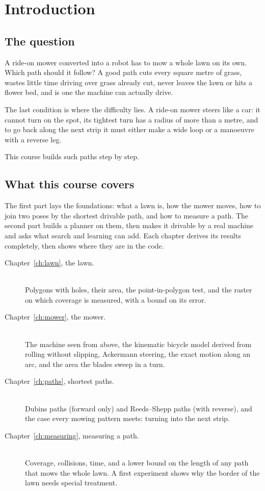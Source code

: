 \chapter{Introduction}
\label{ch:intro}

\section{The question}

A ride-on mower converted into a robot has to mow a whole lawn on its own.
Which path should it follow? A good path cuts every square metre of grass,
wastes little time driving over grass already cut, never leaves the lawn or
hits a flower bed, and is one the machine can actually drive.

The last condition is where the difficulty lies. A ride-on mower steers like
a car: it cannot turn on the spot, its tightest turn has a radius of more than
a metre, and to go back along the next strip it must either make a wide loop
or a manoeuvre with a reverse leg.

This course builds such paths step by step.

\section{What this course covers}

The first part lays the foundations: what a lawn is, how the mower moves,
how to join two poses by the shortest drivable path, and how to measure a
path. The second part builds a planner on them, then makes it drivable by a
real machine and asks what search and learning can add. Each chapter
derives its results completely, then shows where they are in the code.

\begin{description}
  \item[Chapter~\ref{ch:lawn}, the lawn.]
    \leavevmode\\
    Polygons with holes, their area, the point-in-polygon test, and the
    raster on which coverage is measured, with a bound on its error.
  \item[Chapter~\ref{ch:mower}, the mower.]
    \leavevmode\\
    The machine seen from above, the kinematic bicycle model derived from
    rolling without slipping, Ackermann steering, the exact motion along an
    arc, and the area the blades sweep in a turn.
  \item[Chapter~\ref{ch:paths}, shortest paths.]
    \leavevmode\\
    Dubins paths (forward only) and Reeds--Shepp paths (with reverse), and the
    case every mowing pattern meets: turning into the next strip.
  \item[Chapter~\ref{ch:measuring}, measuring a path.]
    \leavevmode\\
    Coverage, collisions, time, and a lower bound on the length of any path
    that mows the whole lawn. A first experiment shows why the border of the
    lawn needs special treatment.
\end{description}

